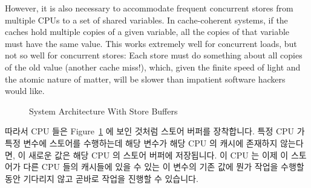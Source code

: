 However, it is also necessary to accommodate frequent concurrent stores
from multiple CPUs to a set of shared variables.
In cache-coherent systems, if the caches hold multiple copies of a given
variable, all the copies of that variable must have the same value.
This works extremely well for concurrent loads, but not so well for
concurrent stores:  Each store must do something about all
copies of the old value (another cache miss!), which, given the finite
speed of light and the atomic nature of matter, will be slower
than impatient software hackers would like.
\fi

\begin{figure}[tb]
\centering
{}
\caption{System Architecture With Store Buffers}
\label{fig:memorder:System Architecture With Store Buffers}
\end{figure}

따라서 CPU 들은
Figure~\ref{fig:memorder:System Architecture With Store Buffers} 에 보인 것처럼
스토어 버퍼를 장착합니다.
특정 CPU 가 특정 변수에 스토어를 수행하는데 해당 변수가 해당 CPU 의 캐시에
존재하지 않는다면, 이 새로운 값은 해당 CPU 의 스토어 버퍼에 저장됩니다.
이 CPU 는 이제 이 스토어가 다른 CPU 들의 캐시들에 있을 수 있는 이 변수의 기존
값에 뭔가 작업을 수행할동안 기다리지 않고 곧바로 작업을 진행할 수 있습니다.

